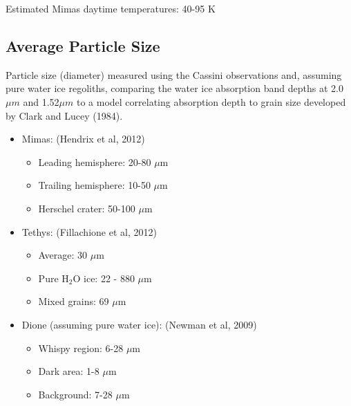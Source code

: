 \documentclass[11pt]{article} %
\begin{document}
	Estimated Mimas daytime temperatures: 40-95 K
	
\subsection{Average Particle Size}
\label{sec:size}

	
Particle size (diameter) measured using the Cassini observations and, assuming pure water ice regoliths, comparing the water ice absorption band depths at 2.0$\mu m$ and 1.52$\mu m$ to a model correlating absorption depth to grain size developed by Clark and Lucey (1984).

	\begin{itemize}
	\item Mimas: (Hendrix et al, 2012)
	\begin{itemize}
		\item Leading hemisphere: 20-80 $\mu$m
		\item Trailing hemisphere: 10-50 $\mu$m
		\item Herschel crater: 50-100 $\mu$m
	\end{itemize}

	\item Tethys: (Fillachione et al, 2012)
	\begin{itemize}
		\item Average: 30 $\mu$m
		\item Pure H$_{2}$O ice: 22 - 880 $\mu$m
		\item Mixed grains: 69 $\mu$m
	\end{itemize}

	\item Dione (assuming pure water ice): (Newman et al, 2009)
	\begin{itemize}
		\item Whispy region: 6-28 $\mu$m
		\item Dark area: 1-8 $\mu$m
		\item Background: 7-28 $\mu$m
	\end{itemize}
	\end{itemize}
\end{document}
